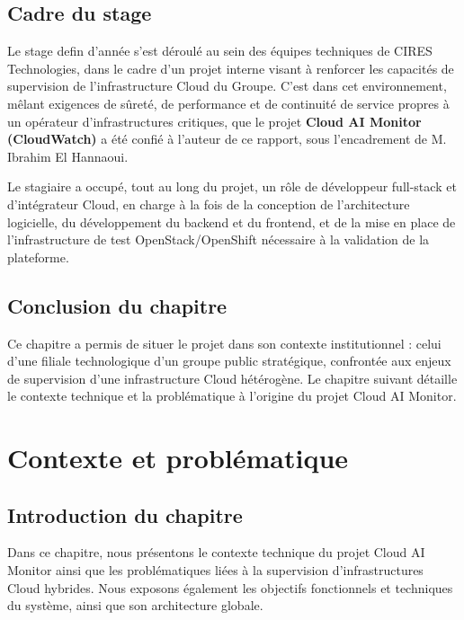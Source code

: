 \documentclass[11pt,a4paper]{report}
\begin{document}
\section{Cadre du stage}

Le stage defin d'année s'est déroulé au sein des équipes techniques de
CIRES Technologies, dans le cadre d'un projet interne visant à renforcer les
capacités de supervision de l'infrastructure Cloud du Groupe. C'est dans cet
environnement, mêlant exigences de sûreté, de performance et de continuité de
service propres à un opérateur d'infrastructures critiques, que le projet
\textbf{Cloud AI Monitor (CloudWatch)} a été confié à l'auteur de ce rapport,
sous l'encadrement de M. Ibrahim El Hannaoui.

Le stagiaire a occupé, tout au long du projet, un rôle de développeur
full-stack et d'intégrateur Cloud, en charge à la fois de la conception de
l'architecture logicielle, du développement du backend et du frontend, et de
la mise en place de l'infrastructure de test OpenStack/OpenShift nécessaire à
la validation de la plateforme.

\section*{Conclusion du chapitre}

Ce chapitre a permis de situer le projet dans son contexte institutionnel :
celui d'une filiale technologique d'un groupe public stratégique, confrontée
aux enjeux de supervision d'une infrastructure Cloud hétérogène. Le chapitre
suivant détaille le contexte technique et la problématique à l'origine du
projet Cloud AI Monitor.

\newpage
\chapter{Contexte et problématique}

\section*{Introduction du chapitre}

Dans ce chapitre, nous présentons le contexte technique du projet Cloud AI
Monitor ainsi que les problématiques liées à la supervision d'infrastructures
Cloud hybrides. Nous exposons également les objectifs fonctionnels et
techniques du système, ainsi que son architecture globale.
\end{document}
